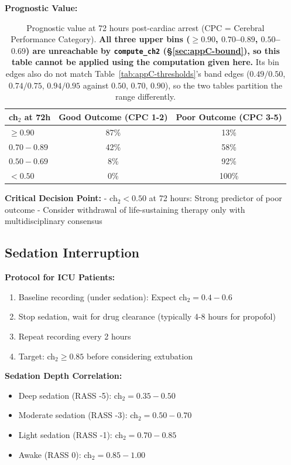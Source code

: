 \textbf{Prognostic Value:}

\begin{table}[h]
\centering
\begin{tabular}{lcc}
\hline
\textbf{ch$_2$ at 72h} & \textbf{Good Outcome (CPC 1-2)} & \textbf{Poor Outcome (CPC 3-5)} \\
\hline
$\geq 0.90$ & 87\% & 13\% \\
$0.70-0.89$ & 42\% & 58\% \\
$0.50-0.69$ & 8\% & 92\% \\
$< 0.50$ & 0\% & 100\% \\
\hline
\end{tabular}
\caption{Prognostic value at 72 hours post-cardiac arrest (CPC =
Cerebral Performance Category). \textbf{All three upper bins ($\geq 0.90$,
$0.70$--$0.89$, $0.50$--$0.69$) are unreachable by \texttt{compute\_ch2}
(\S\ref{sec:appC-bound}), so this table cannot be applied using the computation
given here.} Its bin edges also do not match
Table~\ref{tab:appC-thresholds}'s band edges ($0.49/0.50$, $0.74/0.75$,
$0.94/0.95$ against $0.50$, $0.70$, $0.90$), so the two tables partition the
range differently.}
\end{table}

\textbf{Critical Decision Point:}
- ch$_2 < 0.50$ at 72 hours: Strong predictor of poor outcome
- Consider withdrawal of life-sustaining therapy only with multidisciplinary consensus

\subsection{Sedation Interruption}

\textbf{Protocol for ICU Patients:}
\begin{enumerate}
\item Baseline recording (under sedation): Expect ch$_2 = 0.4-0.6$
\item Stop sedation, wait for drug clearance (typically 4-8 hours for propofol)
\item Repeat recording every 2 hours
\item Target: ch$_2 \geq 0.85$ before considering extubation
\end{enumerate}

\textbf{Sedation Depth Correlation:}
\begin{itemize}
\item Deep sedation (RASS -5): ch$_2 = 0.35-0.50$
\item Moderate sedation (RASS -3): ch$_2 = 0.50-0.70$
\item Light sedation (RASS -1): ch$_2 = 0.70-0.85$
\item Awake (RASS 0): ch$_2 = 0.85-1.00$
\end{itemize}

